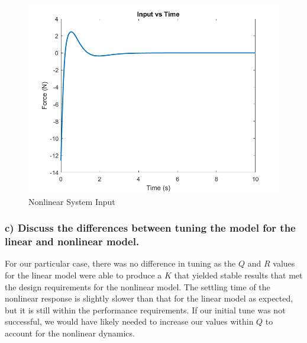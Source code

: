 \begin{figure}[!ht]
    \centering
    \includegraphics[width=\linewidth]{figs/sf_nlin_input.png}
    \caption{Nonlinear System Input}
    \label{}
\end{figure}

\subsubsection*{c) Discuss the differences between tuning the model for the linear and nonlinear model.}

For our particular case, there was no difference in tuning as the $Q$ and $R$ values for the linear model were able to produce a $K$ that yielded stable results that met the design requirements for the nonlinear model. The settling time of the nonlinear response is slightly slower than that for the linear model as expected, but it is still within the performance requirements. If our initial tune was not successful, we would have likely needed to increase our values within $Q$ to account for the nonlinear dynamics.

